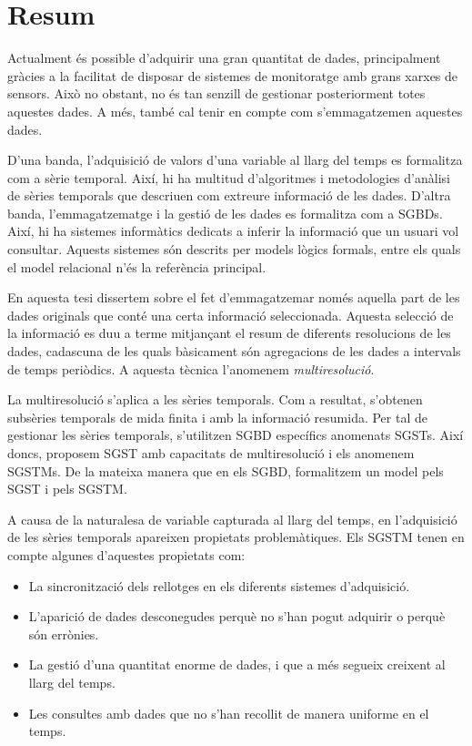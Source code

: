\chapter*{Resum}

Actualment és possible d'adquirir una gran quantitat de dades,
principalment gràcies a la facilitat de disposar de sistemes de
monitoratge amb grans xarxes de sensors. Això no obstant, no és tan
senzill de gestionar posteriorment totes aquestes dades.  A més, també
cal tenir en compte com s'emmagatzemen aquestes dades.


D'una banda, l'adquisició de valors d'una variable al llarg del temps
es formalitza com a sèrie temporal. Així, hi ha multitud d'algoritmes
i metodologies d'anàlisi de sèries temporals que descriuen com
extreure informació de les dades. D'altra banda, l'emmagatzematge i la
gestió de les dades es formalitza com a \glspl{SGBD}. Així, hi ha
sistemes informàtics dedicats a inferir la informació que un usuari
vol consultar. Aquests sistemes són descrits per models lògics
formals, entre els quals el model relacional n'és la referència
principal.


En aquesta tesi dissertem sobre el fet d'emmagatzemar només aquella
part de les dades originals que conté una certa informació
seleccionada. Aquesta selecció de la informació es duu a terme
mitjançant el resum de diferents resolucions de les dades, cadascuna
de les quals bàsicament són agregacions de les dades a intervals de
temps periòdics. A aquesta tècnica l'anomenem \emph{multiresolució}.



La multiresolució s'aplica a les sèries temporals. Com a resultat,
s'obtenen subsèries temporals de mida finita i amb la informació
resumida. Per tal de gestionar les sèries temporals, s'utilitzen
\gls{SGBD} específics anomenats \glspl{SGST}. Així doncs, proposem
\gls{SGST} amb capacitats de multiresolució i els anomenem
\glspl{SGSTM}. De la mateixa manera que en els \gls{SGBD}, formalitzem
un model pels \gls{SGST} i pels \gls{SGSTM}.



A causa de la naturalesa de variable capturada al llarg del temps, en
l'adquisició de les sèries temporals apareixen propietats
problemàtiques. Els \gls{SGSTM} tenen en compte algunes d'aquestes
propietats com:
\begin{itemize}
\item La sincronització dels rellotges en els diferents sistemes
  d'adquisició.
\item L'aparició de dades desconegudes perquè no s'han pogut adquirir
  o perquè són errònies.
\item La gestió d'una quantitat enorme de dades, i que a més segueix
  creixent al llarg del temps.
\item Les consultes amb dades que no s'han recollit de manera uniforme
  en el temps.
\end{itemize}


